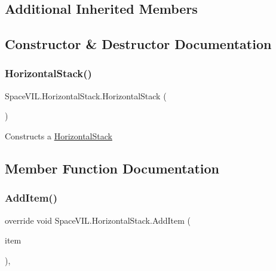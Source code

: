 \subsection*{Additional Inherited Members}


\subsection{Constructor \& Destructor Documentation}
\mbox{\label{class_space_v_i_l_1_1_horizontal_stack_a78e62c1bfb7614d2c3e7c2389d9a676d}} 
\subsubsection{\texorpdfstring{Horizontal\+Stack()}{HorizontalStack()}}
{\footnotesize\ttfamily Space\+V\+I\+L.\+Horizontal\+Stack.\+Horizontal\+Stack (\begin{DoxyParamCaption}{ }\end{DoxyParamCaption})\hspace{0.3cm}{\ttfamily [inline]}}



Constructs a \mbox{\hyperlink{class_space_v_i_l_1_1_horizontal_stack}{Horizontal\+Stack}} 



\subsection{Member Function Documentation}
\mbox{\label{class_space_v_i_l_1_1_horizontal_stack_a159639b3438702fb5b97e78045406f0d}} 
\subsubsection{\texorpdfstring{Add\+Item()}{AddItem()}}
{\footnotesize\ttfamily override void Space\+V\+I\+L.\+Horizontal\+Stack.\+Add\+Item (\begin{DoxyParamCaption}\item[{\mbox{\hyperlink{interface_space_v_i_l_1_1_core_1_1_i_base_item}{I\+Base\+Item}}}]{item }\end{DoxyParamCaption})\hspace{0.3cm}{\ttfamily [inline]}, {\ttfamily [virtual]}}



